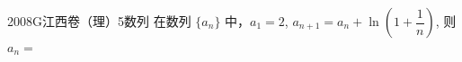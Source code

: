 
\begin{problem}{2008}{G}{江西卷（理）}{5}{数列}
在数列 $ \{a_n\} $ 中，$ a_1 = 2 $, $ a_{n+1} = a_n + \ln \left( 1 + \dfrac{1}{n} \right) $, 则 $ a_n = $
\begin{choices}
\end{choices}
\end{problem}

\begin{answer}

\end{answer}

\begin{solutions}

\end{solutions}